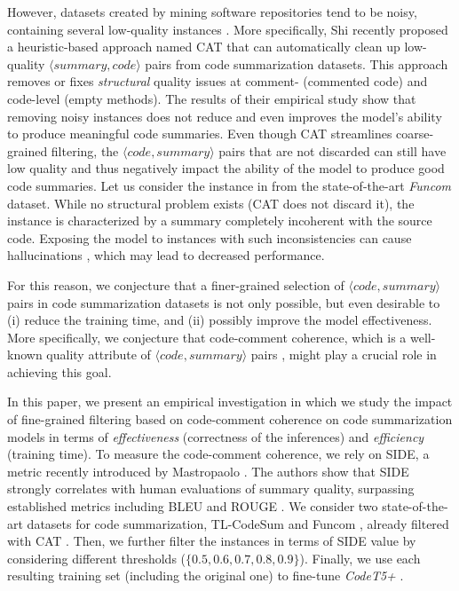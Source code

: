 However, datasets created by mining software repositories tend to be noisy, containing several low-quality instances \cite{BirdBADBFD09,HerzigJZ13,BachmannBRDB10}. More specifically, Shi \etal \cite{shi2022we} recently proposed a heuristic-based approach named CAT that can automatically clean up low-quality $\langle summary, code \rangle$ pairs from code summarization datasets. This approach removes or fixes \textit{structural} quality issues at comment- (\eg commented code) and code-level (\eg empty methods). The results of their empirical study show that removing noisy instances does not reduce and even improves the model's ability to produce meaningful code summaries. 
Even though CAT streamlines coarse-grained filtering, the $\langle code, summary \rangle$ pairs that are not discarded can still have low quality and thus negatively impact the ability of the model to produce good code summaries. 
Let us consider the instance in  from the state-of-the-art \textit{Funcom} dataset. While no structural problem exists (CAT does not discard it), the instance is characterized by a summary completely incoherent with the source code. Exposing the model to instances with such inconsistencies can cause hallucinations \cite{dziri2022origin}, which may lead to decreased performance.

For this reason, we conjecture that a finer-grained selection of $\langle code, summary \rangle$ pairs in code summarization datasets is not only possible, but even desirable to (i) reduce the training time, and (ii) possibly improve the model effectiveness. More specifically, we conjecture that code-comment coherence, which is a well-known quality attribute of $\langle code, summary \rangle$ pairs \cite{corazza2015coherence}, might play a crucial role in achieving this goal.

In this paper, we present an empirical investigation in which we study the impact of fine-grained filtering based on code-comment coherence on code summarization models in terms of \textit{effectiveness} (\ie correctness of the inferences) and \textit{efficiency} (\ie training time). 
To measure the code-comment coherence, we rely on SIDE, a metric recently introduced by Mastropaolo \etal \cite{mastropaolo2024evaluating}. The authors show that SIDE strongly correlates with human evaluations of summary quality, surpassing established metrics including BLEU \cite{papineni2002bleu} and ROUGE \cite{lin2004rouge}.
We consider two state-of-the-art datasets for code summarization, \ie TL-CodeSum \cite{hu2018summarizing} and Funcom \cite{leclair2019neural}, already filtered with CAT \cite{shi2022we}. Then, we further filter the instances in terms of SIDE value by considering different thresholds (\ie $\{0.5, 0.6, 0.7, 0.8, 0.9\}$). Finally, we use each resulting training set (including the original one) to fine-tune \emph{CodeT5+} \cite{wang2023codet5+}.

